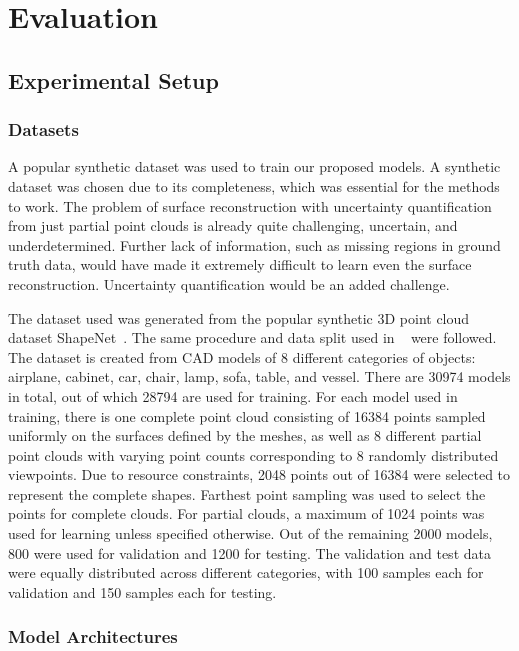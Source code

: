\chapter{Evaluation}\label{ch:evaluation}



\section{Experimental Setup}


    \subsection{Datasets}
    A popular synthetic dataset was used to train our proposed models. A synthetic dataset was chosen due to its completeness, which was essential for the methods to work. The problem of surface reconstruction with uncertainty quantification from just partial point clouds is already quite challenging, uncertain, and underdetermined. Further lack of information, such as missing regions in ground truth data, would have made it extremely difficult to learn even the surface reconstruction. Uncertainty quantification would be an added challenge. 
    \newline
    
    The dataset used was generated from the popular synthetic 3D point cloud dataset ShapeNet~\cite{ShapeNet}. The same procedure and data split used in ~\cite{PCN} were followed. The dataset is created from CAD models of 8 different categories of objects: airplane, cabinet, car, chair, lamp, sofa, table, and vessel. There are 30974 models in total, out of which 28794 are used for training. For each model used in training, there is one complete point cloud consisting of 16384 points sampled uniformly on the surfaces defined by the meshes, as well as 8 different partial point clouds with varying point counts corresponding to 8 randomly distributed viewpoints. Due to resource constraints, 2048 points out of 16384 were selected to represent the complete shapes. Farthest point sampling was used to select the points for complete clouds. For partial clouds, a maximum of 1024 points was used for learning unless specified otherwise. Out of the remaining 2000 models, 800 were used for validation and 1200 for testing. The validation and test data were equally distributed across different categories, with 100 samples each for validation and 150 samples each for testing. 


    \subsection{Model Architectures}

